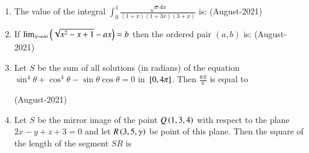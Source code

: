 \documentclass[journal]{IEEEtran}
\begin{document}
\begin{enumerate}
\begin{enumerate}
    \end{enumerate}
    \item The value of the integral $\int_0^1 \frac{\sqrt{x}dx}{(1+x)(1+3x)(3+x)}$ is: \hfill (August-2021)
    \begin{enumerate}
    \end{enumerate}
    \item If $\lim_{x\to\infty} \left(\sqrt{x^2 - x + 1} - ax\right) = b $ 
      then the ordered pair $(a,b)$ is: \hfill (August-2021)
    \begin{enumerate}
    \end{enumerate}
    \item Let $S$ be the sum of all solutions (in radians) of the equation $\sin^4\theta + \cos ^4 \theta - \sin \theta \cos \theta = 0$ in ${}\left[0, 4\pi\right]$. Then $\frac{8S}{\pi}$ is equal to 
    
    \hfill (August-2021)
    
    \item Let $S$ be the mirror image of the point $Q\left(1,3,4\right)$ with respect to the plane $2x - y + z + 3 = 0$ and let $R\left(3,5,\gamma\right) $ be point of this plane. Then the square of the length of the segment $SR$ is 
    

\end{enumerate}
\end{document}
